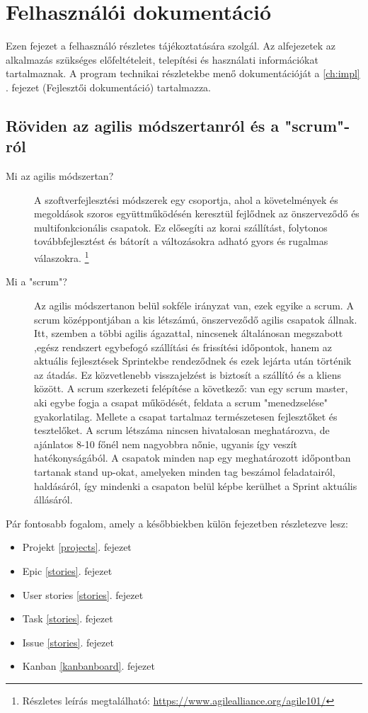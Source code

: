 \chapter{Felhasználói dokumentáció} %
\label{ch:user}

Ezen fejezet a felhasználó részletes tájékoztatására szolgál. Az alfejezetek az alkalmazás szükséges előfeltételeit, telepítési és használati információkat tartalmaznak. A program technikai részletekbe menő dokumentációját a \ref{ch:impl} . fejezet (Fejlesztői dokumentáció) tartalmazza.


\section{Röviden az agilis módszertanról és a  "scrum"-ról} %

\begin{description}
	\item[Mi az agilis módszertan?] A szoftverfejlesztési módszerek egy csoportja, ahol a követelmények és megoldások szoros együttműködésén keresztül fejlődnek az önszerveződő  és 		     	multifonkcionális csapatok. Ez elősegíti az korai szállítást, folytonos továbbfejlesztést és bátorít a változásokra adható gyors és rugalmas válaszokra. \footnote{Részletes leírás 		 	   	megtalálható: \url{https://www.agilealliance.org/agile101/}}
	\item[Mi a "scrum"?] Az agilis módszertanon belül sokféle irányzat van, ezek egyike a scrum. A scrum középpontjában a kis létszámú, önszerveződő agilis csapatok állnak. Itt,
 szemben a többi agilis ágazattal, nincsenek általánosan megszabott ,egész rendszert egybefogó szállítási és frissítési időpontok, hanem az aktuális fejlesztések Sprintekbe rendeződnek és ezek lejárta után történik az átadás. Ez közvetlenebb visszajelzést is biztosít a szállító és a kliens között. A scrum szerkezeti felépítése a következő: van egy scrum master, aki egybe fogja a csapat működését, feldata a scrum "menedzselése" gyakorlatilag. Mellete a csapat tartalmaz természetesen fejlesztőket és tesztelőket. A scrum létszáma nincsen hivatalosan meghatározva, de ajánlatos 8-10 főnél nem nagyobbra nőnie, ugyanis így veszít hatékonyságából. A csapatok minden nap egy meghatározott időpontban tartanak stand up-okat, amelyeken minden tag beszámol feladatairól, haldásáról, így mindenki a csapaton belül képbe kerülhet a Sprint aktuális állásáról.
\end{description}

Pár fontosabb fogalom, amely a későbbiekben külön fejezetben részletezve lesz:
\begin{itemize}
	\item Projekt \ref{projects}. fejezet
	\item Epic \ref{stories}. fejezet
	\item User stories \ref{stories}. fejezet
	\item Task \ref{stories}. fejezet
	\item Issue \ref{stories}. fejezet
	\item Kanban \ref{kanbanboard}. fejezet
\end{itemize}

